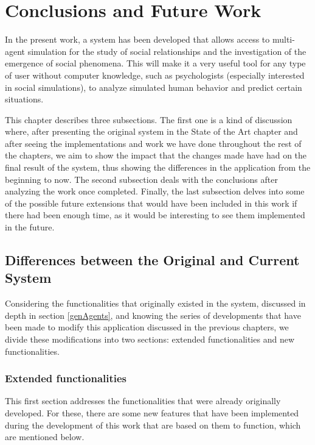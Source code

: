 \chapter*{Conclusions and Future Work}
\label{cap:conclusions}

In the present work, a system has been developed that allows access to multi-agent simulation for the study of social relationships and the investigation of the emergence of social phenomena. This will make it a very useful tool for any type of user without computer knowledge, such as psychologists (especially interested in social simulations), to analyze simulated human behavior and predict certain situations.

This chapter describes three subsections. The first one is a kind of discussion where, after presenting the original system in the State of the Art chapter and after seeing the implementations and work we have done throughout the rest of the chapters, we aim to show the impact that the changes made have had on the final result of the system, thus showing the differences in the application from the beginning to now. The second subsection deals with the conclusions after analyzing the work once completed. Finally, the last subsection delves into some of the possible future extensions that would have been included in this work if there had been enough time, as it would be interesting to see them implemented in the future.

\section*{Differences between the Original and Current System}

Considering the functionalities that originally existed in the system, discussed in depth in section \ref{genAgents}, and knowing the series of developments that have been made to modify this application discussed in the previous chapters, we divide these modifications into two sections: extended functionalities and new functionalities.

\subsection*{Extended functionalities}
This first section addresses the functionalities that were already originally developed. For these, there are some new features that have been implemented during the development of this work that are based on them to function, which are mentioned below.

